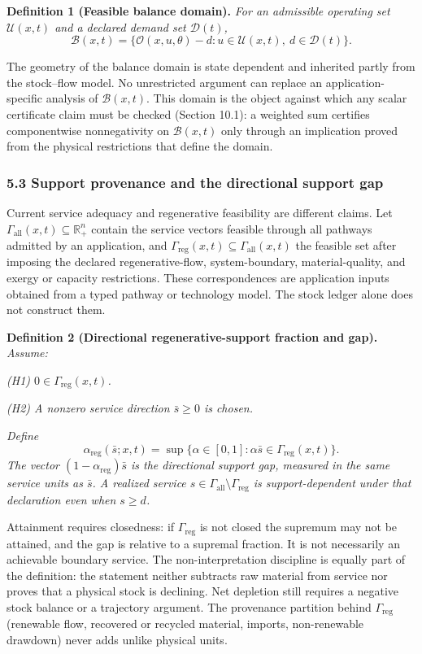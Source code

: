 \documentclass[11pt]{article}
\begin{document}
\textbf{Definition 1 (Feasible balance domain).} \emph{For an admissible
operating set \(\mathcal{U}(x,t)\) and a declared demand set
\(\mathcal{D}(t)\),}
\[\mathcal{B}(x,t) = \{ \mathcal{O}(x,u,\theta) - d : u \in \mathcal{U}(x,t),\ d \in \mathcal{D}(t) \}.\]

The geometry of the balance domain is state dependent and inherited partly from the stock--flow model. No unrestricted argument can replace an application-specific analysis of \(\mathcal{B}(x,t)\). This domain is the object against which any scalar certificate claim must be checked (Section 10.1): a weighted sum certifies componentwise nonnegativity on \(\mathcal{B}(x,t)\) only through an implication proved from the physical restrictions that define the domain.

\subsubsection{5.3 Support provenance and the directional support
gap}\label{support-provenance-and-the-directional-support-gap}

Current service adequacy and regenerative feasibility are different claims. Let \(\Gamma_{\mathrm{all}}(x,t) \subseteq \mathbb{R}^n_+\) contain the service vectors feasible through all pathways admitted by an application, and \(\Gamma_{\mathrm{reg}}(x,t) \subseteq \Gamma_{\mathrm{all}}(x,t)\) the feasible set after imposing the declared regenerative-flow, system-boundary, material-quality, and exergy or capacity restrictions. These correspondences are application inputs obtained from a typed pathway or technology model. The stock ledger alone does not construct them.

\textbf{Definition 2 (Directional regenerative-support fraction and
gap).} \emph{Assume:}

\emph{(H1) \(0 \in \Gamma_{\mathrm{reg}}(x,t)\).}

\emph{(H2) A nonzero service direction \(\bar s \ge 0\) is chosen.}

\emph{Define}
\[\alpha_{\mathrm{reg}}(\bar s; x, t) = \sup\{ \alpha \in [0,1] : \alpha \bar s \in \Gamma_{\mathrm{reg}}(x,t) \}.\]
\emph{The vector \((1 - \alpha_{\mathrm{reg}})\bar s\) is the
directional support gap, measured in the same service units as
\(\bar s\). A realized service
\(s \in \Gamma_{\mathrm{all}} \setminus \Gamma_{\mathrm{reg}}\) is
support-dependent under that declaration even when \(s \ge d\).}

Attainment requires closedness: if \(\Gamma_{\mathrm{reg}}\) is not closed the supremum may not be attained, and the gap is relative to a supremal fraction. It is not necessarily an achievable boundary service. The non-interpretation discipline is equally part of the definition: the statement neither subtracts raw material from service nor proves that a physical stock is declining. Net depletion still requires a negative stock balance or a trajectory argument. The provenance partition behind \(\Gamma_{\mathrm{reg}}\) (renewable flow, recovered or recycled material, imports, non-renewable drawdown) never adds unlike physical units.
\end{document}
